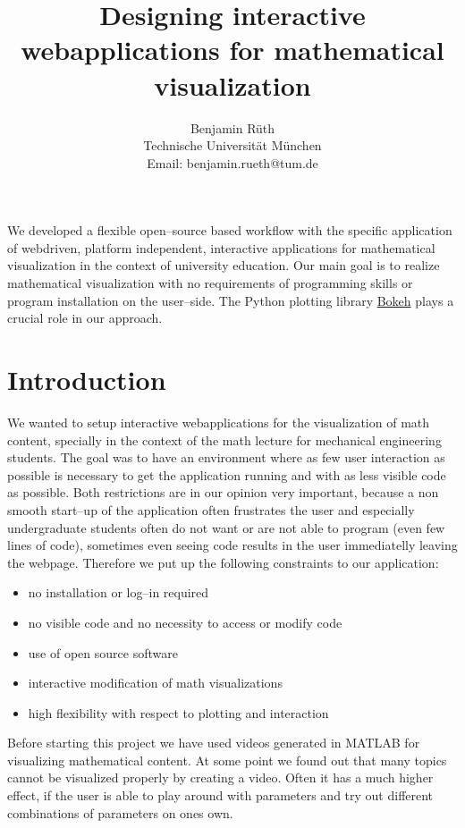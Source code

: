 \documentclass[a4paper,pdftex]{scrartcl}
\begin{document}
\title{Designing interactive webapplications for mathematical visualization}
\subtitle{}

\author{
Benjamin Rüth\\
Technische Universit\"at M\"unchen\\
Email: benjamin.rueth@tum.de 
}

\maketitle

We developed a flexible open--source based workflow with the specific application of webdriven, platform independent, interactive applications for mathematical visualization in the context of university education. Our main goal is to realize mathematical visualization with no requirements of programming skills or program installation on the user--side. The Python plotting library \href{http://bokeh.pydata.org/}{Bokeh} plays a crucial role in our approach.

\section{Introduction}
We wanted to setup interactive webapplications for the visualization of math content, specially in the context of the math lecture for mechanical engineering students. The goal was to have an environment where as few user interaction as possible is necessary to get the application running and with as less visible code as possible. Both restrictions are in our opinion very important, because a non smooth start--up of the application often frustrates the user and especially undergraduate students often do not want or are not able to program (even few lines of code), sometimes even seeing code results in the user immediatelly leaving the webpage. Therefore we put up the following constraints to our application:
\begin{itemize}
\item no installation or log--in required
\item no visible code and no necessity to access or modify code 
\item use of open source software
\item interactive modification of math visualizations
\item high flexibility with respect to plotting and interaction
\end{itemize}
Before starting this project we have used videos generated in MATLAB for visualizing mathematical content. At some point we found out that many topics cannot be visualized properly by creating a video. Often it has a much higher effect, if the user is able to play around with parameters and try out different combinations of parameters on ones own.
\end{document}
